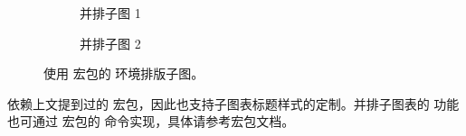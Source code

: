 \begin{figure}[htp]
  \centering
  \begin{subfigure}{12em}
    \centering
    \caption{并排子图 1}
    \label{fig:subfigure-cap1}
  \end{subfigure}
  \qquad
  \begin{subfigure}{12em}
    \centering
    \caption{并排子图 2}
    \label{fig:subfigure-cap2}
  \end{subfigure}
  \caption{使用  宏包的  环境排版子图。}
  \label{fig:subcaption}
\end{figure}

 依赖上文提到过的  宏包，因此也支持子图表标题样式的定制。并排子图表的
功能也可通过  宏包的  命令实现，具体请参考宏包文档。

\endinput
